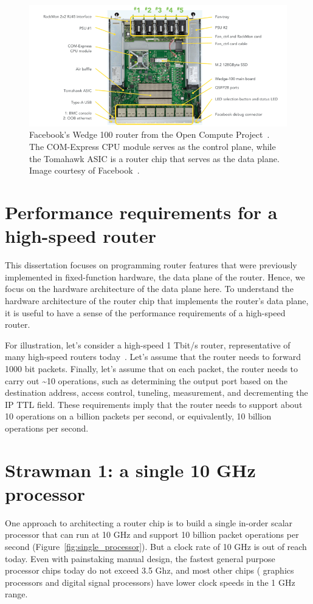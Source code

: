 \begin{figure}
\centering
\includegraphics[width=\textwidth]{wedge100.png}
\caption{Facebook's Wedge 100 router from the Open Compute Project~\cite{ocp}.
The COM-Express CPU module serves as the control plane, while the Tomahawk ASIC
is a router chip that serves as the data plane. Image courtesy of
Facebook~\cite{wedge100}.}
\label{fig:router_box}
\end{figure}

\section{Performance requirements for a high-speed router}
This dissertation focuses on programming router features that were previously
implemented in fixed-function hardware, \ie the data plane of the router.
Hence, we focus on the hardware architecture of the data plane here.  To
understand the hardware architecture of the router chip that implements the
router's data plane, it is useful to have a sense of the performance
requirements of a high-speed router.

For illustration, let's consider a high-speed 1 Tbit/s router, representative
of many high-speed routers today~\cite{trident2, tomahawk, tomahawk2}. Let's
assume that the router needs to forward 1000 bit packets. Finally, let's assume
that on each packet, the router needs to carry out \textasciitilde10
operations, such as determining the output port based on the destination
address, access control, tuneling, measurement, and decrementing the IP TTL
field. These requirements imply that the router needs to support about 10
operations on a billion packets per second, or equivalently, 10 billion
operations per second.

\section{Strawman 1: a single 10 GHz processor}
One approach to architecting a router chip is to build a single in-order scalar
processor that can run at 10 GHz and support 10 billion packet operations per
second (Figure~\ref{fig:single_processor}). But a clock rate of 10 GHz is out
of reach today. Even with painstaking manual design, the fastest general
purpose processor chips today do not exceed 3.5 Ghz, and most other chips (\eg
graphics processors and digital signal processors) have lower clock speeds in
the 1 GHz range.

